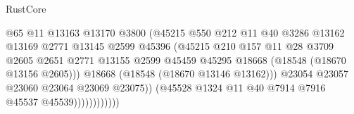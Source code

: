 \begin{lexlean}{RustCore}
\begin{coremodule}
                                              @65
                                              @11
                                              @13163
                                              @13170
                                              @3800
                                              (@45215
                                                @550
                                                @212
                                                @11
                                                @40
                                                @3286
                                                @13162
                                                @13169
                                                @2771
                                                @13145
                                                @2599
                                                @45396
                                                (@45215
                                                  @210
                                                  @157
                                                  @11
                                                  @28
                                                  @3709
                                                  @2605
                                                  @2651
                                                  @2771
                                                  @13155
                                                  @2599
                                                  @45459
                                                  @45295
                                                  @18668
                                                  (@18548 (@18670 @13156 @2605)))
                                                @18668
                                                (@18548 (@18670 @13146 @13162)))
                                              @23054
                                              @23057
                                              @23060
                                              @23064
                                              @23069
                                              @23075))
                                          (@45528
                                            @1324
                                            @11
                                            @40
                                            @7914
                                            @7916
                                            @45537
                                            @45539))))))))))))

\end{coremodule}
\end{lexlean}
